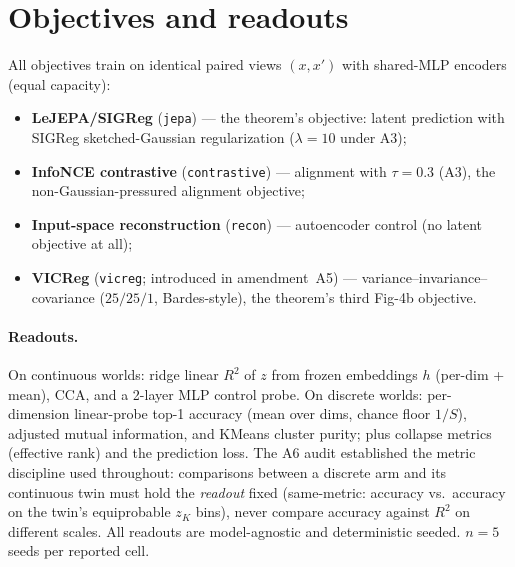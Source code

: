 \documentclass[10pt]{article}
\begin{document}
\section{Objectives and readouts}
\label{sec:objectives}
All objectives train on identical paired views $(x,x')$ with shared-MLP
encoders (equal capacity):
\begin{itemize}[leftmargin=*,itemsep=1pt]
\item \textbf{LeJEPA/SIGReg} (\texttt{jepa}) --- the theorem's objective:
latent prediction with SIGReg sketched-Gaussian regularization
($\lambda{=}10$ under A3);
\item \textbf{InfoNCE contrastive} (\texttt{contrastive}) --- alignment with
$\tau{=}0.3$ (A3), the non-Gaussian-pressured alignment objective;
\item \textbf{Input-space reconstruction} (\texttt{recon}) --- autoencoder
control (no latent objective at all);
\item \textbf{VICReg} (\texttt{vicreg}; introduced in amendment~A5) --- variance--invariance--
covariance ($25/25/1$, Bardes-style), the theorem's third Fig-4b objective.
\end{itemize}

\paragraph{Readouts.} \label{sec:readouts}
On continuous worlds: ridge linear $R^2$ of $z$ from frozen embeddings $h$
(per-dim + mean), CCA, and a 2-layer MLP control probe. On discrete worlds:
per-dimension linear-probe top-1 accuracy (mean over dims, chance floor
$1/S$), adjusted mutual information, and KMeans cluster purity; plus collapse
metrics (effective rank) and the prediction loss. The A6 audit established the
metric discipline used throughout: comparisons between a discrete arm and its
continuous twin must hold the \emph{readout} fixed (same-metric: accuracy vs.\
accuracy on the twin's equiprobable $z_K$ bins), never compare accuracy against
$R^2$ on different scales. All readouts are model-agnostic and deterministic
seeded. $n{=}5$ seeds per reported cell.
\end{document}
